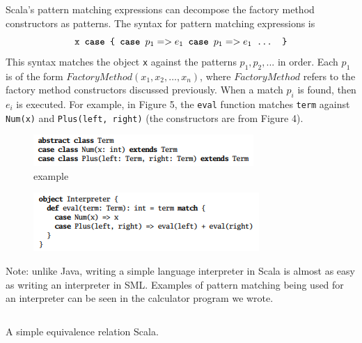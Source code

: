 \documentclass[jou,apacite]{IEEEtran}
\begin{document}
Scala's pattern matching expressions can decompose the factory method
constructors as patterns. The syntax for pattern matching expressions is
\[                              %
    \texttt{x \textbf{case} \{ \textbf{case} $p_1 => e_1$ \textbf{case} $p_1 => e_1$ ... \}}
\]
This syntax matches the object \texttt{x} against the patterns $p_1, p_2, ...$
in order. Each $p_1$ is of the form $FactoryMethod(x_1, x_2, …, x_n)$, where
$FactoryMethod$ refers to the factory method constructors discussed
previously. When a match $p_i$ is found, then $e_i$ is executed. For example, in
Figure 5, the \texttt{eval} function matches \texttt{term} against
\texttt{Num(x)} and \texttt{Plus(left, right)} (the constructors are from Figure
4).

\begin{figure}[h]
  \centering
  \includegraphics[width=\columnwidth]{abstract_class}
  \caption{example}
  \label{fig:example}
\end{figure}

\begin{figure}[h]
  \centering
  \includegraphics[width=\columnwidth]{pattern_match}
  \caption{}
  \label{fig:example}
\end{figure}

Note: unlike Java, writing a simple language interpreter in Scala is almost as easy as writing an interpreter in SML. Examples of pattern matching being used for an interpreter can be seen in the calculator program we wrote.




\begin{listing}
  \inputminted[firstline=3, frame=single]{Scala}{../examples/Equiv.scala}
  \caption{A simple equivalence relation Scala.}
  \label{lst:equiv}
\end{listing}
\end{document}
